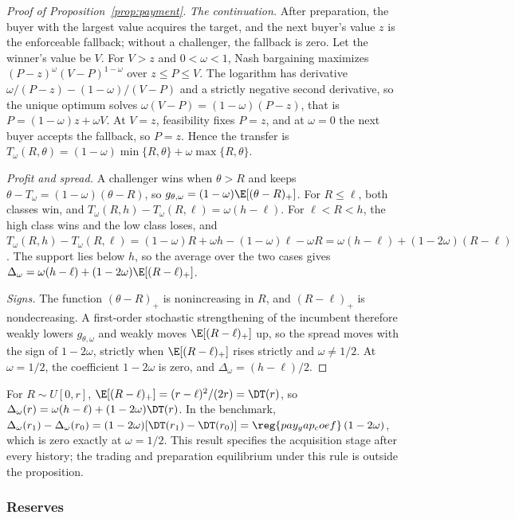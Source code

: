 \begin{proof}[Proof of Proposition~\ref{prop:payment}]
\emph{The continuation.} After preparation, the buyer with the largest value acquires the target, and the next
buyer's value \(z\) is the enforceable fallback; without a challenger, the fallback is zero. Let the winner's value be
\(V\). For \(V>z\) and \(0<\omega<1\), Nash bargaining maximizes \((P-z)^\omega(V-P)^{1-\omega}\) over \(z\le P\le V\).
The logarithm has derivative \(\omega/(P-z)-(1-\omega)/(V-P)\) and a strictly negative second derivative, so the
unique optimum solves \(\omega(V-P)=(1-\omega)(P-z)\), that is \(P=(1-\omega)z+\omega V\). At \(V=z\), feasibility
fixes \(P=z\), and at \(\omega=0\) the next buyer accepts the fallback, so \(P=z\). Hence the transfer is
\(T_\omega(R,\theta)=(1-\omega)\min\{R,\theta\}+\omega\max\{R,\theta\}\).

\emph{Profit and spread.} A challenger wins when \(\theta>R\) and keeps \(\theta-T_\omega=(1-\omega)(\theta-R)\), so
\(g_{\theta,\omega}=(1-\omega)\E[(\theta-R)_+]\). For \(R\le\ell\), both classes win, and
\(T_\omega(R,h)-T_\omega(R,\ell)=\omega(h-\ell)\). For \(\ell<R<h\), the high class wins and the low class loses, and
\(T_\omega(R,h)-T_\omega(R,\ell)=(1-\omega)R+\omega h-(1-\omega)\ell-\omega R=\omega(h-\ell)+(1-2\omega)(R-\ell)\). The
support lies below \(h\), so the average over the two cases gives
\(\Delta_\omega=\omega(h-\ell)+(1-2\omega)\E[(R-\ell)_+]\).

\emph{Signs.} The function \((\theta-R)_+\) is nonincreasing in \(R\), and \((R-\ell)_+\) is nondecreasing. A
first-order stochastic strengthening of the incumbent therefore weakly lowers \(g_{\theta,\omega}\) and weakly moves
\(\E[(R-\ell)_+]\) up, so the spread moves with the sign of \(1-2\omega\), strictly when \(\E[(R-\ell)_+]\) rises
strictly and \(\omega\ne1/2\). At \(\omega=1/2\), the coefficient \(1-2\omega\) is zero, and \(\Delta_\omega=(h-\ell)/2\).
\end{proof}

For \(R\sim U[0,r]\), \(\E[(R-\ell)_+]=(r-\ell)^2/(2r)=\DT(r)\), so \(\Delta_\omega(r)=\omega(h-\ell)+(1-2\omega)\DT(r)\).
In the benchmark, \(\Delta_\omega(r_1)-\Delta_\omega(r_0)=(1-2\omega)[\DT(r_1)-\DT(r_0)]=\reg{pay_gap_coef}\,(1-2\omega)\),
which is zero exactly at \(\omega=1/2\). This result specifies the acquisition stage after every history; the trading
and preparation equilibrium under this rule is outside the proposition.

\subsubsection*{Reserves}

